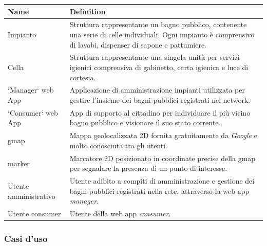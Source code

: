 \documentclass[12pt]{article}
\begin{document}
\begin{center}
    \begin{tabular}{ | l |  p{10cm} |}
    \hline
    \textbf{Name} & \textbf{Definition} \\ \hline
    Impianto & Struttura rappresentante un bagno pubblico, contenente una serie di celle individuali. Ogni impianto è comprensivo di lavabi, dispenser di sapone e pattumiere. \\ \hline
    Cella & Struttura rappresentante una singola unità per servizi igienici comprensiva di gabinetto, carta igienica e luce di cortesia. \\ \hline
    `Manager` web App & Applicazione di amministrazione impianti utilizzata per gestire l'insieme dei bagni pubblici registrati nel network.\\ \hline
    `Consumer` web App & App di supporto al cittadino per individuare il più vicino bagno pubblico e visionare il suo stato corrente.\\ \hline
    gmap & Mappa geolocalizzata 2D fornita gratuitamente da \textit{Google} e molto conosciuta tra gli utenti.\\ \hline
    marker & Marcatore 2D posizionato in coordinate precise della gmap per segnalare la presenza di un punto di interesse.\\ \hline
    Utente amministrativo & Utente adibito a compiti di amministrazione e gestione dei bagni pubblici registrati nella rete, attraverso la web app \textit{manager}.\\ \hline
    Utente consumer & Utente della web app \textit{consumer}. \\ \hline
    \end{tabular}
\end{center}	
\newpage
\subsubsection{Casi d'uso}
\end{document}
